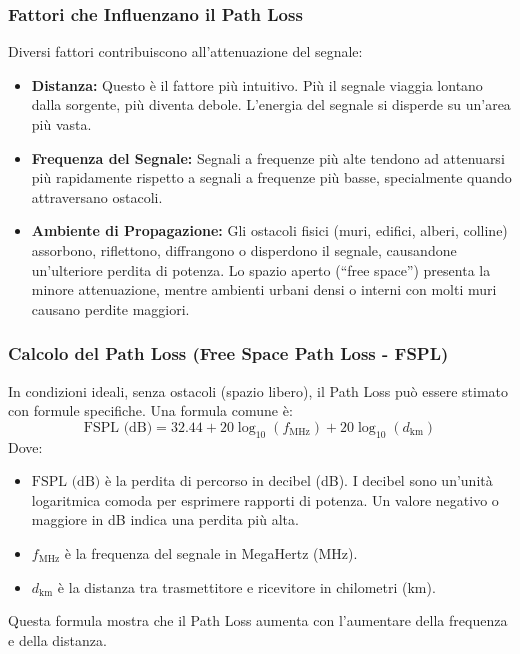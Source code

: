 \subsubsection{Fattori che Influenzano il Path Loss}
Diversi fattori contribuiscono all'attenuazione del segnale:
\begin{itemize}
    \item \textbf{Distanza:} Questo è il fattore più intuitivo. Più il segnale viaggia lontano dalla sorgente, più diventa debole. L'energia del segnale si disperde su un'area più vasta.
    \item \textbf{Frequenza del Segnale:} Segnali a frequenze più alte tendono ad attenuarsi più rapidamente rispetto a segnali a frequenze più basse, specialmente quando attraversano ostacoli.
    \item \textbf{Ambiente di Propagazione:} Gli ostacoli fisici (muri, edifici, alberi, colline) assorbono, riflettono, diffrangono o disperdono il segnale, causandone un'ulteriore perdita di potenza. Lo spazio aperto (``free space'') presenta la minore attenuazione, mentre ambienti urbani densi o interni con molti muri causano perdite maggiori.
\end{itemize}

\subsubsection{Calcolo del Path Loss (Free Space Path Loss - FSPL)}
In condizioni ideali, senza ostacoli (spazio libero), il Path Loss può essere stimato con formule specifiche. Una formula comune è:
\[ \text{FSPL (dB)} = 32.44 + 20 \log_{10}(f_{\text{MHz}}) + 20 \log_{10}(d_{\text{km}}) \]
Dove:
\begin{itemize}
    \item $\text{FSPL (dB)}$ è la perdita di percorso in decibel (dB). I decibel sono un'unità logaritmica comoda per esprimere rapporti di potenza. Un valore negativo o maggiore in dB indica una perdita più alta.
    \item $f_{\text{MHz}}$ è la frequenza del segnale in MegaHertz (MHz).
    \item $d_{\text{km}}$ è la distanza tra trasmettitore e ricevitore in chilometri (km).
\end{itemize}
Questa formula mostra che il Path Loss aumenta con l'aumentare della frequenza e della distanza.

